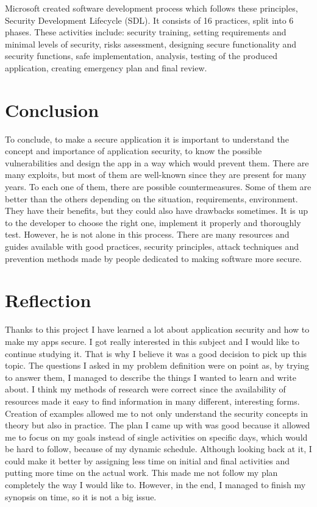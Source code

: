 \documentclass[a4paper]{article}
\begin{document}
Microsoft created software development process which follows these principles,
Security Development Lifecycle (SDL). It consists of 16 practices, split into 6
phases. These activities include: security training, setting requirements and
minimal levels of security, risks assessment, designing secure functionality and
security functions, safe implementation, analysis, testing of the produced
application, creating emergency plan and final review.

\newpage

\section{Conclusion}

To conclude, to make a secure application it is important to understand the
concept and importance of application security, to know the possible
vulnerabilities and design the app in a way which would prevent them. There are
many exploits, but most of them are well-known since they are present for many
years. To each one of them, there are possible countermeasures. Some of them are
better than the others depending on the situation, requirements, environment.
They have their benefits, but they could also have drawbacks sometimes. It is up
to the developer to choose the right one, implement it properly and thoroughly
test. However, he is not alone in this process. There are many resources and
guides available with good practices, security principles, attack techniques and
prevention methods made by people dedicated to making software more secure.

\section{Reflection}

Thanks to this project I have learned a lot about application security and how
to make my apps secure. I got really interested in this subject and I would
like to continue studying it. That is why I believe it was a good decision to
pick up this topic. The questions I asked in my problem definition were on
point as, by trying to answer them, I managed to describe the things I wanted
to learn and write about. I think my methods of research were correct since the
availability of resources made it easy to find information in many different,
interesting forms.  Creation of examples allowed me to not only understand the
security concepts in theory but also in practice. The plan I came up with was
good because it allowed me to focus on my goals instead of single activities on
specific days, which would be hard to follow, because of my dynamic schedule.
Although looking back at it, I could make it better by assigning less time on
initial and final activities and putting more time on the actual work. This
made me not follow my plan completely the way I would like to. However, in the
end, I managed to finish my synopsis on time, so it is not a big issue.
\end{document}
